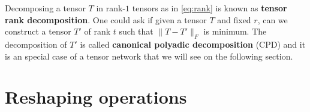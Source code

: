 \documentclass[11pt,a4paper,openright,oneside]{book}
\numberwithin{equation}{section}
\newtheorem{prop0}[defn0]{Proposition}
\newenvironment{proposition}{\bigskip \begin{prop0}}{\end{prop0}}
\newcommand{\refeq}[1]{\cref{#1}}
\DeclareMathOperator{\rank}{rank}
\begin{document}

Decomposing a tensor $T$ in rank-$1$ tensors as in \refeq{eq:rank} is known as \textbf{tensor rank decomposition}.
One could ask if given a tensor $T$ and fixed $r$, can we construct a tensor $T'$ of rank $t$ such that
$\| T - T' \|_F$ is minimum. The decomposition of $T'$ is called \textbf{canonical polyadic decomposition} (\gls{CPD}) and it is
an special case of a tensor network that we will see on the following section.



\section{Reshaping operations}

\end{document}
